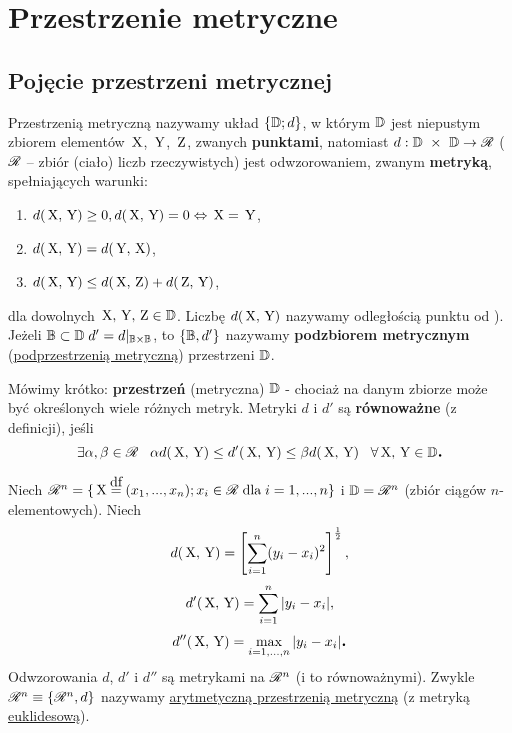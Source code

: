 
\section{Przestrzenie metryczne}

\subsection{Pojęcie przestrzeni metrycznej}

\begin{mydef}
    Przestrzenią metryczną nazywamy układ $\{\mathbb{D}; d\}$, w którym $\mathbb{D}$ jest niepustym zbiorem elementów $\,\textnormal{X}$, $\,\textnormal{Y}$, $\,\textnormal{Z}$, zwanych \textbf{punktami}, natomiast $d: \mathbb{D}~\times~\mathbb{D} \to \mathscr{R}$ ($\mathscr{R}$ -- zbiór (ciało) liczb rzeczywistych) jest odwzorowaniem, zwanym \textbf{metryką}, spełniających warunki:
    \begin{enumerate}
     \item $d(\,\textnormal{X},\,\textnormal{Y}) \geq 0, d(\,\textnormal{X},\,\textnormal{Y})=0 \Leftrightarrow \,\textnormal{X} = \,\textnormal{Y}$,
     \item $d(\,\textnormal{X},\,\textnormal{Y}) = d(\,\textnormal{Y},\,\textnormal{X})$,
     \item $d(\,\textnormal{X},\,\textnormal{Y}) \leq d(\,\textnormal{X},\,\textnormal{Z}) + d(\,\textnormal{Z},\,\textnormal{Y})$,
    \end{enumerate}
    dla dowolnych $\,\textnormal{X}, \,\textnormal{Y}, \,\textnormal{Z} \in \mathbb{D}$. Liczbę $d(\,\textnormal{X},\,\textnormal{Y})$ nazywamy odległością punktu  od ). Jeżeli $\mathbb{B} \subset \mathbb{D} \;d' = d|_{\mathbb{B} \times \mathbb{B}}$, to $\{\mathbb{B}, d'\}$ nazywamy \textbf{podzbiorem metrycznym} (\underline{podprzestrzenią metryczną}) przestrzeni $\mathbb{D}$.
\end{mydef}

\begin{info}
    Mówimy krótko: \textbf{przestrzeń} (metryczna) $\mathbb{D}$ - chociaż na danym zbiorze może być określonych wiele różnych metryk. Metryki $d$ i $d'$ są \textbf{równoważne} (z definicji), jeśli
    \[\exists \alpha,\beta \in \mathscr{R} \;\;\; \alpha d(\,\textnormal{X},\,\textnormal{Y}) \leq d'(\,\textnormal{X},\,\textnormal{Y}) \leq \beta d(\,\textnormal{X},\,\textnormal{Y}) \;\;\; \forall \,\textnormal{X},\,\textnormal{Y}\in\mathbb{D}\mbox{\large\bfseries .}\]
\end{info}

\begin{example}
    Niech $\real^n = \{\p{X}\df (x_1, ..., x_n); x_i\in\real \;\text{dla}\; i=1,...,n\}$ i $\mathbb{D} = \mathscr{R}^n$ (zbiór ciągów $n$-elementowych). Niech
    \[d(\,\textnormal{X},\,\textnormal{Y}) = \left[\sum^{n}_{i=1}(y_i-x_i)^2\right]^\frac{1}{2},\]
    \[d'(\,\textnormal{X},\,\textnormal{Y}) = \sum^n_{i=1}|y_i-x_i|,\]
    \[d''(\,\textnormal{X},\,\textnormal{Y}) = \max_{i=1,...,n}|y_i-x_i|\mbox{\large\bfseries .}\]
    Odwzorowania $d$, $d'$ i $d''$ są metrykami na $\mathscr{R}^n$ (i to równoważnymi). Zwykle $\mathscr{R}^n \equiv \{\mathscr{R}^n, d\}$ nazywamy \underline{arytmetyczną przestrzenią metryczną} (z metryką \underline{euklidesową}). 
\end{example}

